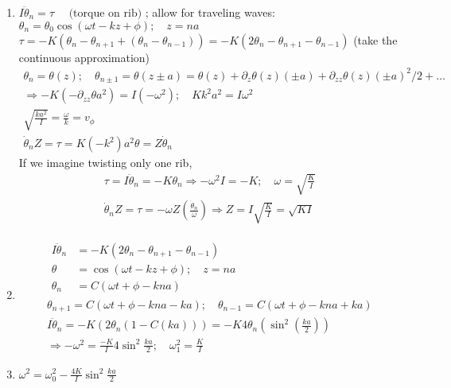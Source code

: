 \documentclass[twoside,10pt]{amsart}
\newcommand{\problemhead}[1]
  {\smallskip
   \noindent{\large\bf Problem #1.}
   \smallskip}
\begin{document}
\problemhead{4.14} 
\begin{enumerate}
  \item $I \ddot{\theta}_n = \tau \quad \text{ (torque on rib) } $; allow for traveling waves: $\theta_n = \theta_0 \cos{ (\omega t - kz + \phi) }; \quad z = na $ \\
$\tau = -K(\theta_n - \theta_{n+1} + (\theta_n - \theta_{n-1} ) ) = - K ( 2 \theta_n - \theta_{n+1} - \theta_{n-1} )$ (take the continuous approximation) 
    \[
    \begin{gathered}
      \theta_n = \theta(z); \quad \theta_{n\pm 1 } = \theta(z \pm a) = \theta(z) + \partial_z \theta(z)(\pm a) + \partial_{zz}\theta(z) (\pm a)^2/2 + \dots \\
      \Longrightarrow -K(-\partial_{zz} \theta a^2 ) = I (-\omega^2); \quad Kk^2 a^2 = I \omega^2 \\
      \boxed{ \sqrt{ \frac{ ka^2}{I } } = \frac{ \omega}{ k } = v_{\phi} } \\
      \dot{\theta}_n Z = \tau = K(-k^2 ) a^2 \theta = Z\dot{ \theta}_n 
    \end{gathered}
    \]
If we imagine twisting only one rib, 
\[
\begin{gathered}
  \tau = I \ddot{\theta}_n = -K\theta_n \Longrightarrow - \omega^2 I = -K; \quad \omega  = \sqrt{ \frac{ K }{I } } \\
  \dot{\theta}_n Z = \tau = - \omega Z \left( \frac{ \dot{\theta}_n }{ \omega } \right) \Longrightarrow Z = I \sqrt{\frac{K}{I}} = \sqrt{ KI}
\end{gathered}
\]
  \item 
\[
\begin{gathered}
  \begin{aligned}
    I\ddot{\theta}_n & = -K (2 \theta_n - \theta_{n+1} - \theta_{n-1} ) \\
    \theta &= \cos{ (\omega t - kz + \phi) }; \quad z = na \\
    \theta_n & = C(\omega t + \phi- kna)
  \end{aligned} \\
  \theta_{n+1} = C( \omega t + \phi - kna - ka) ; \quad \theta_{n-1} = C( \omega t + \phi - kna + ka ) \\ 
  I\ddot{\theta}_n = - K (2 \theta_n (1 - C(ka) ) ) = - K 4 \theta_n ( \sin^2{ \left( \frac{ka}{2} \right) } ) \\
  \Longrightarrow -\omega^2 = \frac{ -K }{I } 4 \sin^2{ \frac{ka}{2} }; \quad \omega_1^2 = \frac{K}{I} 
\end{gathered}
\]
\item $\omega^2 = \omega_0^2  - \frac{4K}{I} \sin^2{ \frac{ka}{2} }$  
\end{enumerate}
\end{document}

